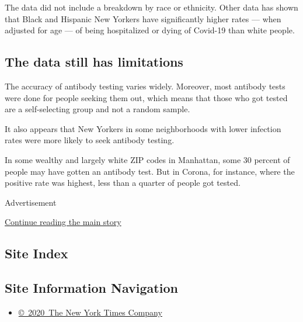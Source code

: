 The data did not include a breakdown by race or ethnicity. Other data
has shown that Black and Hispanic New Yorkers have significantly higher
rates --- when adjusted for age --- of being hospitalized or dying of
Covid-19 than white people.

\hypertarget{the-data-still-has-limitations}{%
\subsection{The data still has
limitations}\label{the-data-still-has-limitations}}

The accuracy of antibody testing varies widely. Moreover, most antibody
tests were done for people seeking them out, which means that those who
got tested are a self-selecting group and not a random sample.

It also appears that New Yorkers in some neighborhoods with lower
infection rates were more likely to seek antibody testing.

In some wealthy and largely white ZIP codes in Manhattan, some 30
percent of people may have gotten an antibody test. But in Corona, for
instance, where the positive rate was highest, less than a quarter of
people got tested.

Advertisement

\protect\hyperlink{after-bottom}{Continue reading the main story}

\hypertarget{site-index}{%
\subsection{Site Index}\label{site-index}}

\hypertarget{site-information-navigation}{%
\subsection{Site Information
Navigation}\label{site-information-navigation}}

\begin{itemize}
\tightlist
\item
  \href{https://help.nytimes3xbfgragh.onion/hc/en-us/articles/115014792127-Copyright-notice}{©~2020~The
  New York Times Company}
\end{itemize}


